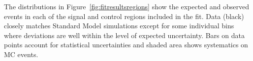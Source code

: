 The distributions in Figure~\ref{fig:fitresultsregions} show the expected and observed events in each of the signal and control regions included in the fit. Data (black) closely matches Standard Model simulations except for some individual bins where deviations are well within the level of expected uncertainty. Bars on data points account for statistical uncertainties and shaded area shows systematics on MC events. 

\begin{figure}[!h]
\centering
  \hfill
  \hfill
  \hfill
  \hfill
\end{figure}
